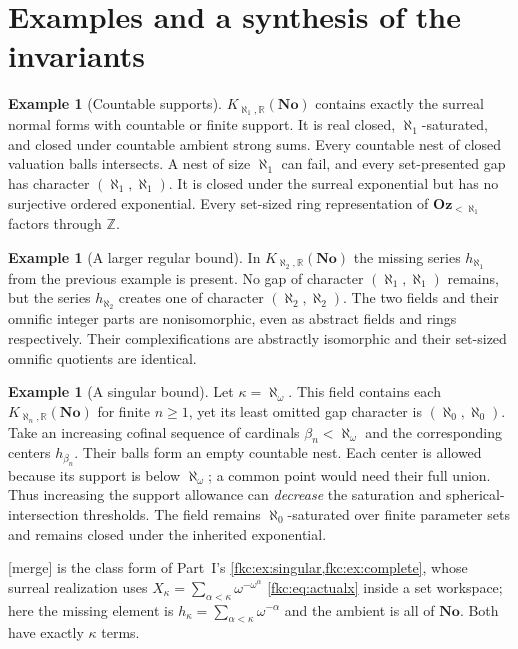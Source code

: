 \documentclass[11pt,letterpaper]{article}
\numberwithin{equation}{section}
\theoremstyle{definition}
\newtheorem{example}[theorem]{Example}
\theoremstyle{remark}
\newcommand{\R}{\mathbb R}
\newcommand{\No}{\mathbf{No}}
\newcommand{\mergetag}{\textup{\textsf{\small[merge]}}}%
\newcommand{\Z}{\mathbb Z}
\newcommand{\Oz}{\mathbf{Oz}}
\newcommand{\KN}[2]{K_{#1,#2}(\No)}%
\newcommand{\Okl}[1]{\Oz_{<#1}}
\begin{document}
\section{Examples and a synthesis of the invariants}\label{fkc:sb:sec:examples}

\begin{example}[Countable supports]\label{fkc:sb:ex:countable}
$\KN{\aleph_1}\R$ contains exactly the surreal normal forms with countable or finite support. It is real closed, $\aleph_1$-saturated, and closed under countable ambient strong sums. Every countable nest of closed valuation balls intersects. A nest of size $\aleph_1$ can fail, and every set-presented gap has character $(\aleph_1,\aleph_1)$. It is closed under the surreal exponential but has no surjective ordered exponential. Every set-sized ring representation of $\Okl{\aleph_1}$ factors through $\Z$.
\end{example}

\begin{example}[A larger regular bound]\label{fkc:sb:ex:regular}
In $\KN{\aleph_2}\R$ the missing series $h_{\aleph_1}$ from the previous example is present. No gap of character $(\aleph_1,\aleph_1)$ remains, but the series $h_{\aleph_2}$ creates one of character $(\aleph_2,\aleph_2)$. The two fields and their omnific integer parts are nonisomorphic, even as abstract fields and rings respectively. Their complexifications are abstractly isomorphic and their set-sized omnific quotients are identical.
\end{example}

\begin{example}[A singular bound]\label{fkc:sb:ex:singular}
Let $\kappa=\aleph_\omega$. This field contains each $\KN{\aleph_n}\R$ for finite $n\ge1$, yet its least omitted gap character is $(\aleph_0,\aleph_0)$. Take an increasing cofinal sequence of cardinals $\beta_n<\aleph_\omega$ and the corresponding centers $h_{\beta_n}$. Their balls form an empty countable nest. Each center is allowed because its support is below $\aleph_\omega$; a common point would need their full union. Thus increasing the support allowance can \emph{decrease} the saturation and spherical-intersection thresholds. The field remains $\aleph_0$-saturated over finite parameter sets and remains closed under the inherited exponential.
\end{example}
\mergetag{}  is the class form of Part~I's \cref{fkc:ex:singular,fkc:ex:complete}, whose surreal realization uses $X_\kappa=\sum_{\alpha<\kappa}\omega^{-\omega^\alpha}$ \eqref{fkc:eq:actualx} inside a set workspace; here the missing element is $h_\kappa=\sum_{\alpha<\kappa}\omega^{-\alpha}$ and the ambient is all of $\No$. Both have exactly $\kappa$ terms.
\end{document}
